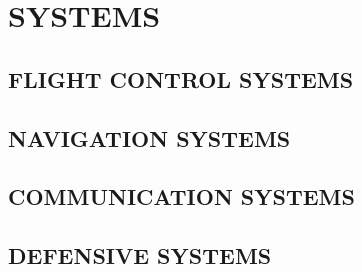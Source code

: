 \chapter{SYSTEMS}
\minitoc
\cleardoublepage

\section{FLIGHT CONTROL SYSTEMS}

\clearpage

\section{NAVIGATION SYSTEMS}

\clearpage

\section{COMMUNICATION SYSTEMS}

\clearpage

\section{DEFENSIVE SYSTEMS}

\clearpage

\cleardoublepage